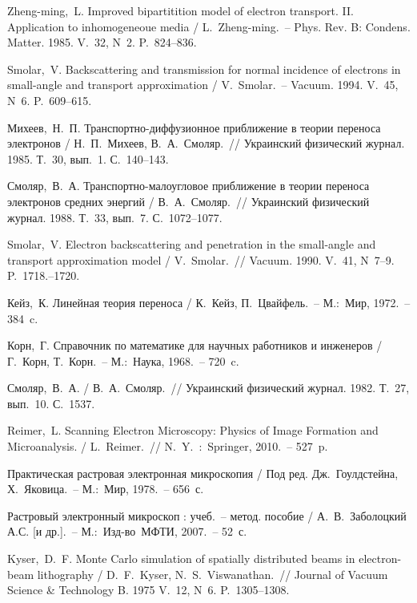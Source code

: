\def\bibname{Список использованной литературы}
\begin{thebibliography}{99}  

 Zheng-ming,~L. Improved bipartitition model of electron
transport. II. Application to inhomogeneoue media / L.~Zheng-ming.~-- Phys. Rev. B:
Condens. Matter. 1985. V.~32, N~2. P.~824--836.

 Smolar,~V. Backscattering and transmission for normal
incidence of electrons in small-angle and transport approximation /
V.~Smolar.~-- Vacuum. 1994. V.~45, N~6. P.~609--615.

 Михеев,~Н.~П. Транспортно-диффузионное приближение в теории
переноса электронов / Н.~П.~Михеев, В.~А.~Смоляр.~// Украинский физический
журнал. 1985. Т.~30, вып.~1. С.~140--143.

 Смоляр,~В.~А. Транспортно-малоугловое приближение в теории
переноса электронов средних энергий / В.~А.~Смоляр.~// Украинский физический
журнал. 1988. Т.~33, вып.~7. С.~1072--1077.

 Smolar,~V. Electron backscattering and penetration in the
small-angle and transport approximation model / V.~Smolar.~// Vacuum. 1990.
V.~41, N~7--9. P.~1718.--1720.

 Кейз,~К. Линейная теория переноса / К.~Кейз, П.~Цвайфель.~--
М.:~Мир, 1972.~-- 384~c.

 Корн,~Г. Справочник по математике для научных работников и
инженеров /  Г.~Корн, Т.~Корн.~-- М.:~Наука, 1968.~-- 720~c.

 Смоляр,~В.~А. / В.~А.~Смоляр.~// Украинский физический журнал.
1982. Т.~27, вып.~10. С.~1537. %


 Reimer,~L. Scanning Electron Microscopy: Physics of Image Formation
and Microanalysis. / L.~Reimer.~// N.~Y.~:~Springer, 2010.~-- 527~p.

 Практическая растровая электронная микроскопия / Под ред.
Дж.~Гоулдстейна, Х.~Яковица.~-- М.:~Мир, 1978.~-- 656~с.

 Растровый электронный микроскоп : учеб.~-- метод. пособие /
А.~В.~Заболоцкий А.С. [и др.].~-- М.:~Изд-во~МФТИ, 2007.~--
52~с. %

 Kyser,~D.~F. Monte Carlo simulation of spatially
distributed beams in electron-beam lithography / D.~F.~Kyser,
N.~S.~Viswanathan.~// Journal of Vacuum Science \& Technology B. 1975 V.~12,
N~6. P.~1305--1308.


\end{thebibliography}

